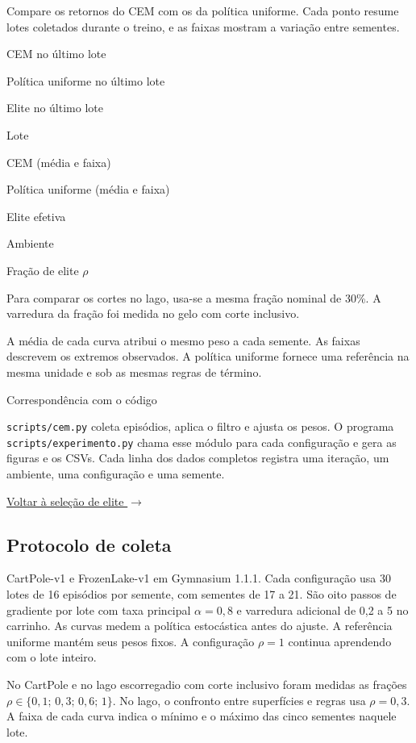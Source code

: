Compare os retornos do CEM com os da política uniforme. Cada ponto resume lotes coletados durante o treino, e as faixas mostram a variação entre sementes.

CEM no último lote

Política uniforme no último lote

Elite no último lote

Lote

CEM (média e faixa)

Política uniforme (média e faixa)

Elite efetiva

Ambiente

Fração de elite $\rho$

Para comparar os cortes no lago, usa-se a mesma fração nominal de 30\%. A varredura da fração foi medida no gelo com corte inclusivo.

A média de cada curva atribui o mesmo peso a cada semente. As faixas descrevem os extremos observados. A política uniforme fornece uma referência na mesma unidade e sob as mesmas regras de término.

Correspondência com o código

\texttt{scripts/cem.py} coleta episódios, aplica o filtro e ajusta os pesos. O programa \texttt{scripts/experimento.py} chama esse módulo para cada configuração e gera as figuras e os CSVs. Cada linha dos dados completos registra uma iteração, um ambiente, uma configuração e uma semente.

\href{selecao.html}{Voltar à seleção de elite $\rightarrow$}

\subsection*{Protocolo de coleta}
CartPole-v1 e FrozenLake-v1 em Gymnasium 1.1.1. Cada configuração usa 30 lotes de 16 episódios por semente, com sementes de 17 a 21. São oito passos de gradiente por lote com taxa principal $\alpha=0{,}8$ e varredura adicional de 0,2 a 5 no carrinho. As curvas medem a política estocástica antes do ajuste. A referência uniforme mantém seus pesos fixos. A configuração $\rho=1$ continua aprendendo com o lote inteiro.

No CartPole e no lago escorregadio com corte inclusivo foram medidas as frações $\rho\in\{0{,}1;\,0{,}3;\,0{,}6;\,1\}$. No lago, o confronto entre superfícies e regras usa $\rho=0{,}3$. A faixa de cada curva indica o mínimo e o máximo das cinco sementes naquele lote.

